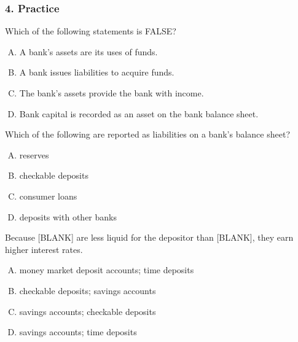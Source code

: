\documentclass{beamer}
\begin{document}
\begin{practiceframe}
\frametitle{4. Practice}
\vspace{-1em}

    Which of the following statements is FALSE?
    \begin{enumerate}[A. ]
        \item A bank's assets are its uses of funds.
        \item A bank issues liabilities to acquire funds.
        \item The bank's assets provide the bank with income.
        \item Bank capital is recorded as an asset on the bank balance sheet.
    \end{enumerate}
    
    Which of the following are reported as liabilities on a bank's balance sheet?
    \begin{enumerate}[A. ]
        \item reserves
        \item checkable deposits
        \item consumer loans
        \item deposits with other banks
    \end{enumerate}
    Because [BLANK] are less liquid for the depositor than [BLANK], they earn higher interest rates.
    \begin{enumerate} [A. ]
        \item money market deposit accounts; time deposits
        \item checkable deposits; savings accounts
        \item savings accounts; checkable deposits
        \item savings accounts; time deposits
    \end{enumerate}
    
\end{practiceframe}
\end{document}
